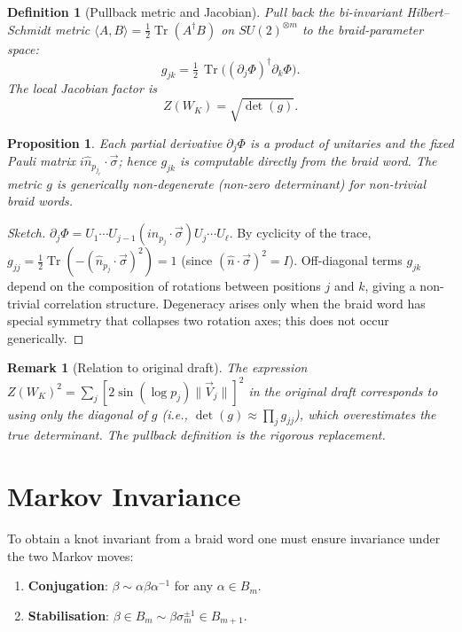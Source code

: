 \documentclass[11pt]{article}
\newtheorem{definition}{Definition}[section]
\newtheorem{proposition}{Proposition}[section]
\newtheorem{remark}{Remark}[section]
\newcommand{\Tr}{\operatorname{Tr}}
\newcommand{\hatN}[1]{\hat{n}_{#1}}
\begin{document}
\begin{definition}[Pullback metric and Jacobian]
Pull back the bi-invariant Hilbert--Schmidt metric $\langle A,B\rangle=\tfrac12\Tr(A^\dagger B)$ on $SU(2)^{\otimes m}$ to the braid-parameter space:
\[
g_{jk} = \tfrac12\,\Tr\!\bigl((\partial_j\Phi)^\dagger\partial_k\Phi\bigr).
\]
The \emph{local Jacobian factor} is
\[
Z(W_K) = \sqrt{\det(g)}.
\]
\end{definition}

\begin{proposition}
Each partial derivative $\partial_j\Phi$ is a product of unitaries and the fixed Pauli matrix $i\hatN{p_{j_r}}\cdot\vec{\sigma}$; hence $g_{jk}$ is computable directly from the braid word. The metric $g$ is generically non-degenerate (non-zero determinant) for non-trivial braid words.
\end{proposition}

\begin{proof}[Sketch]
$\partial_j\Phi = U_1\cdots U_{j-1}(i\hatN{p_j}\cdot\vec{\sigma})U_j\cdots U_\ell$. By cyclicity of the trace, $g_{jj}=\tfrac12\Tr(-(\hatN{p_j}\cdot\vec{\sigma})^2)=1$ (since $(\hat{n}\cdot\vec{\sigma})^2=I$). Off-diagonal terms $g_{jk}$ depend on the composition of rotations between positions $j$ and $k$, giving a non-trivial correlation structure. Degeneracy arises only when the braid word has special symmetry that collapses two rotation axes; this does not occur generically.
\end{proof}

\begin{remark}[Relation to original draft]
The expression $Z(W_K)^2=\sum_j[2\sin(\log p_j)\|\vec{V}_j\|]^2$ in the original draft corresponds to using only the diagonal of $g$ (i.e., $\det(g)\approx\prod_j g_{jj}$), which overestimates the true determinant. The pullback definition is the rigorous replacement.
\end{remark}

\section{Markov Invariance}

To obtain a knot invariant from a braid word one must ensure invariance under the two Markov moves:
\begin{enumerate}
  \item \textbf{Conjugation}: $\beta\sim\alpha\beta\alpha^{-1}$ for any $\alpha\in B_m$.
  \item \textbf{Stabilisation}: $\beta\in B_m\sim\beta\sigma_m^{\pm1}\in B_{m+1}$.
\end{enumerate}
\end{document}
